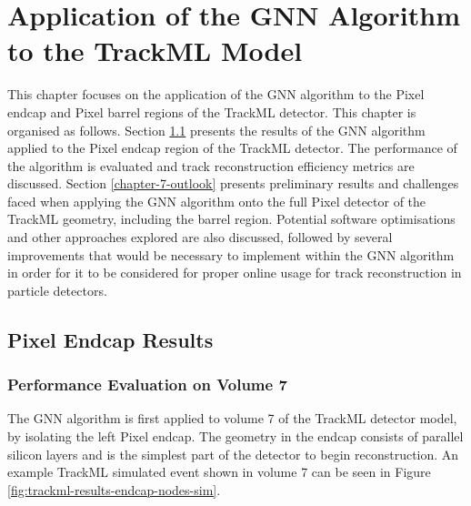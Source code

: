 
\chapter{Application of the GNN Algorithm to the TrackML Model}
\label{chapter-7}

This chapter focuses on the application of the GNN algorithm to the Pixel endcap and Pixel barrel regions of the TrackML detector. This chapter is organised as follows. Section \ref{chapter-7-endcap-results} presents the results of the GNN algorithm applied to the Pixel endcap region of the TrackML detector. The performance of the algorithm is evaluated and track reconstruction efficiency metrics are discussed. Section \ref{chapter-7-outlook} presents preliminary results and challenges faced when applying the GNN algorithm onto the full Pixel detector of the TrackML geometry, including the barrel region. Potential software optimisations and other approaches explored are also discussed, followed by several improvements that would be necessary to implement within the GNN algorithm in order for it to be considered for proper online usage for track reconstruction in particle detectors.



\section{Pixel Endcap Results}
\label{chapter-7-endcap-results}


\subsection{Performance Evaluation on Volume 7}
\label{performance-eval-endcap-vol-7-start}

The GNN algorithm is first applied to volume 7 of the TrackML detector model, by isolating the left Pixel endcap. The geometry in the endcap consists of parallel silicon layers and is the simplest part of the detector to begin reconstruction. An example TrackML simulated event shown in volume 7 can be seen in Figure \ref{fig:trackml-results-endcap-nodes-sim}.

